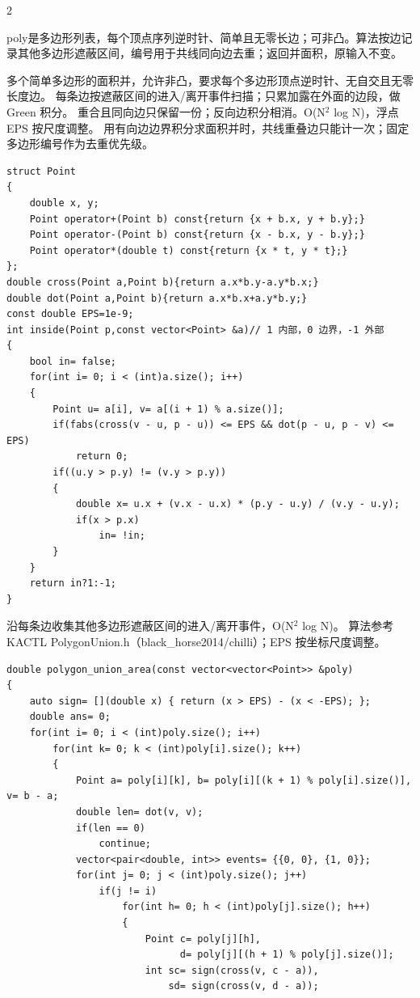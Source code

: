 \documentclass[UTF8,fontset=fandol,a4paper,twoside]{ctexart}
\newcommand{\note}[1]{{\fontsize{10}{12}\selectfont #1\par}}
\begin{document}
\begin{multicols}{2}
\note{poly是多边形列表，每个顶点序列逆时针、简单且无零长边；可非凸。算法按边记录其他多边形遮蔽区间，编号用于共线同向边去重；返回并面积，原输入不变。}
\note{多个简单多边形的面积并，允许非凸，要求每个多边形顶点逆时针、无自交且无零长度边。 每条边按遮蔽区间的进入/\allowbreak{}离开事件扫描；只累加露在外面的边段，做 Green 积分。 重合且同向边只保留一份；反向边积分相消。O(\allowbreak{}N\ensuremath{^2} log N)\allowbreak{}，浮点 EPS 按尺度调整。 用有向边边界积分求面积并时，共线重叠边只能计一次；固定多边形编号作为去重优先级。}
\begin{lstlisting}
struct Point
{
    double x, y;
    Point operator+(Point b) const{return {x + b.x, y + b.y};}
    Point operator-(Point b) const{return {x - b.x, y - b.y};}
    Point operator*(double t) const{return {x * t, y * t};}
};
double cross(Point a,Point b){return a.x*b.y-a.y*b.x;}
double dot(Point a,Point b){return a.x*b.x+a.y*b.y;}
const double EPS=1e-9;
int inside(Point p,const vector<Point> &a)// 1 内部，0 边界，-1 外部
{
    bool in= false;
    for(int i= 0; i < (int)a.size(); i++)
    {
        Point u= a[i], v= a[(i + 1) % a.size()];
        if(fabs(cross(v - u, p - u)) <= EPS && dot(p - u, p - v) <= EPS)
            return 0;
        if((u.y > p.y) != (v.y > p.y))
        {
            double x= u.x + (v.x - u.x) * (p.y - u.y) / (v.y - u.y);
            if(x > p.x)
                in= !in;
        }
    }
    return in?1:-1;
}
\end{lstlisting}
\note{沿每条边收集其他多边形遮蔽区间的进入/\allowbreak{}离开事件，O(\allowbreak{}N\ensuremath{^2} log N)\allowbreak{}。 算法参考 KACTL PolygonUnion.\allowbreak{}h（black\_horse2014/\allowbreak{}chilli）；EPS 按坐标尺度调整。}
\begin{lstlisting}
double polygon_union_area(const vector<vector<Point>> &poly)
{
    auto sign= [](double x) { return (x > EPS) - (x < -EPS); };
    double ans= 0;
    for(int i= 0; i < (int)poly.size(); i++)
        for(int k= 0; k < (int)poly[i].size(); k++)
        {
            Point a= poly[i][k], b= poly[i][(k + 1) % poly[i].size()], v= b - a;
            double len= dot(v, v);
            if(len == 0)
                continue;
            vector<pair<double, int>> events= {{0, 0}, {1, 0}};
            for(int j= 0; j < (int)poly.size(); j++)
                if(j != i)
                    for(int h= 0; h < (int)poly[j].size(); h++)
                    {
                        Point c= poly[j][h],
                              d= poly[j][(h + 1) % poly[j].size()];
                        int sc= sign(cross(v, c - a)),
                            sd= sign(cross(v, d - a));

\end{lstlisting}
\end{multicols}
\end{document}
